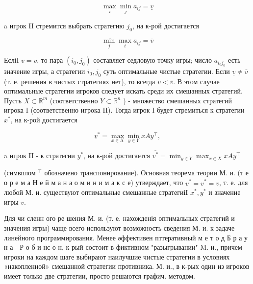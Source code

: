 \documentclass[10pt]{article}
\begin{document}
\[

\max _{i} \min _{j} a_{i j}=\underline{v}

\]



a игрок II стремится выбрать стратегию $j_{0}$, на к-рой достигается



\[

\min _{j} \max _{i} a_{i j}=\bar{v}

\]



ЕсліІ $v=\bar{v}$, то пара $\left(i_{0}, j_{0}\right)$ составляет седловую точку игры; число $a_{i_{0} j_{0}}$ есть значение игры, а стратегии $i_{0}, j_{0}$ суть оптимальные чистые стратегии. Если $\underline{v} \neq \bar{v}$ (т. е. решения в чистых стратегиях нет), то всегда $\underline{v}<\bar{v}$. В этом случае оптимальные стратегии игроков следует искать среди их смешанных стратегий. Пусть $X \subset \mathbb{R}^{m}$ (соответственно $Y \subset \mathbb{R}^{n}$ ) - множество смешанных стратегий игрока I (соответственно игрока II). Тогда игрок I будет стремиться к стратегии $x^{*}$, на к-рой достигается



\[

\underline{v}^{*}=\max _{x \in X} \min _{y \in Y} x A y^{\top},

\]



a игрок II - к стратегии $y^{*}$, на к-рой достигается $\overline{v^{*}}=\min _{y \in Y} \max _{x \in X} x A y^{\top}$



(симвплом ${ }^{\top}$ обозначено транспонирование). Основная теорема теории М. и. (т е о р е м а Н е й м а н а о м и н и м а к с е) утверждает, что $v^{*}=\overline{v^{*}}=v$, т. е. для любой М. и. существуют оптимальные смешанные стратегиіI $x^{*}, y^{*}$ и значение игры $v$.



Для чи сленн ого ре шения М. и. (т. е. нахожденія оптимальных стратегий и значения игры) чаще всего используют возможность сведения М. и. к задаче линейного программирования. Менее әффективен пттеративный м е т о д Б р а у н а - Р о б и нс о н, к-рый состоит в фиктивном "разыгрывании" M. и., причем игроки на каждом шаге выбирают наилучшие чистые стратегии в условиях «накопленной» смешанной стратегии противника. М. и., в к-рых один из игроков имеет только две стратегии, просто решаются графич. методом.
\end{document}
